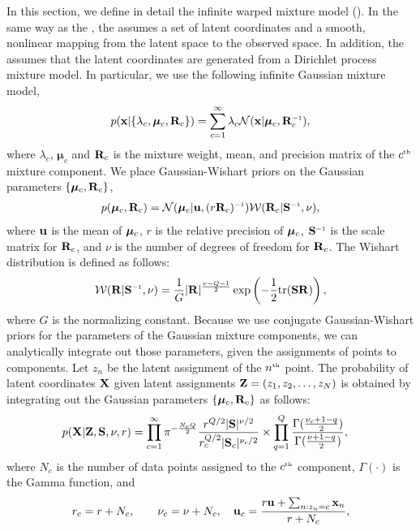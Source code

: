 In this section, we define in detail the infinite warped mixture model (\iwmm{}).
In the same way as the \gplvm{}, the \iwmm{} assumes a set of latent coordinates and a smooth, nonlinear mapping from the latent space to the observed space.
In addition, the \iwmm{} assumes that the latent coordinates
are generated from a Dirichlet process mixture model.
In particular, we use the following infinite Gaussian mixture model,
\begin{align}
p(\vx|\{\lambda_{c},\bm{\mu}_{c},\vR_{c}\}) = \sum_{c=1}^{\infty} \lambda_{c} {\cal N}(\vx|\bm{\mu}_{c},\vR_{c}\inv),
\end{align}
where $\lambda_{c}$, $\bm{\mu}_{c}$ and $\mathbf{R}_{c}$ is the mixture weight, 
mean, and precision matrix of the $c^{\text{\tiny th}}$ mixture component.
We place Gaussian-Wishart priors on the Gaussian parameters
$\{\bm{\mu}_{c},\mathbf{R}_{c}\}$,
\begin{align}
p(\bm{\mu}_{c},\vR_{c})
= {\cal N}(\bm{\mu}_{c}|\vu,(r\vR_{c})\inv)
{\cal W}(\vR_{c}|\vS\inv,\nu),
\end{align}
%
where ${\bf{u}}$ is the mean of $\boldsymbol{\mu}_c$, $r$ is the relative precision of $\boldsymbol{\mu}_{c}$, $\vS\inv$ is the scale matrix for $\mathbf{R}_c$, and $\nu$ is the number of degrees of freedom for $\mathbf{R}_c$.
The Wishart distribution is defined as follows:
%
\begin{align}
{\cal W}(\vR|\vS\inv,\nu)
=\frac{1}{G}|\vR|^{\frac{\nu-Q-1}{2}}\exp\left(-\frac{1}{2}{\rm tr}(\vS\vR)\right),
\end{align}
%
where $G$ is the normalizing constant.
Because we use conjugate Gaussian-Wishart priors for the parameters of the Gaussian mixture components, we can analytically integrate out those parameters, given the assignments of points to components.
Let $z_{n}$ be the latent assignment of the $n^{\text{\tiny th}}$ point.
The probability of latent coordinates $\mathbf{X}$ given latent assignments $\mathbf{Z}=(z_1, z_2, \dots, z_N)$ is obtained by integrating out the Gaussian parameters $\{\boldsymbol{\mu}_c,\mathbf{R}_c\}$ as follows:
%
\begin{align}
p(\mathbf{X}|\mathbf{Z},\mathbf{S},\nu,r) &= \prod_{c=1}^{\infty}
\pi^{-\frac{N_{c}Q}{2}}\frac{r^{Q/2}|\mathbf{S}|^{\nu/2}}{r_{c}^{Q/2}|\mathbf{S}_{c}|^{\nu_{c}/2}}
\times \prod_{q=1}^{Q}\frac{\Gamma(\frac{\nu_{c}+1-q}{2})}{\Gamma(\frac{\nu+1-q}{2})},
\label{eq:px_z}
\end{align}
%
where
$N_c$ is the number of data points assigned to the $c^{\text{\tiny th}}$ component,
$\Gamma(\cdot)$ is the Gamma function, and
%
\begin{align}
r_{c}=r+N_{c}, \hspace{2em}
\nu_{c}=\nu+N_{c}, 
\quad
{\bf{u}}_{c}=\frac{r{\bf{u}}+\sum_{n:z_{n}=c}{\bf{x}}_{n}}{r+N_{c}}, 
\nonumber
\end{align}
